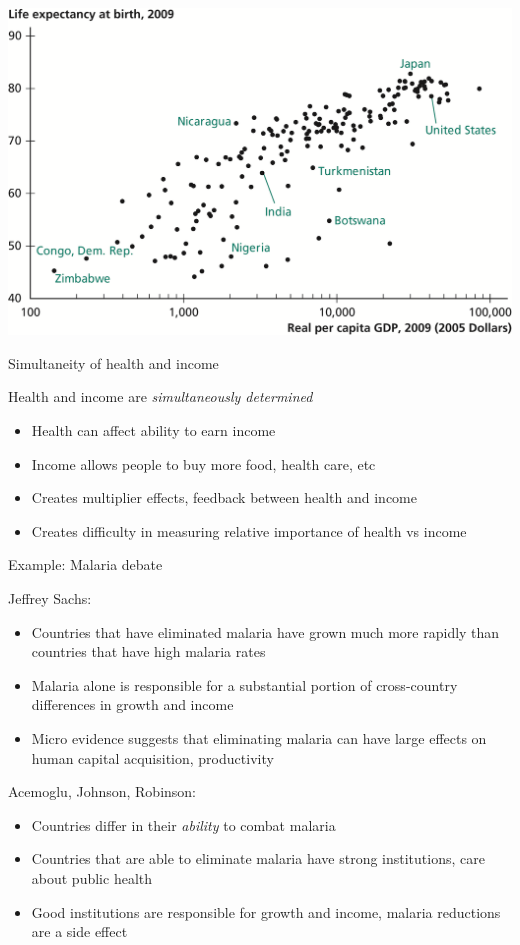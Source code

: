 \documentclass[10pt]{beamer}
\begin{document}
\begin{frame}[label={sec:org1004679}]{}
\begin{center}
\includegraphics[width=.75\textwidth]{./img/6.2.png}
\end{center}
\end{frame}

\begin{frame}[label={sec:org5c37440}]{}
\alert{Simultaneity of health and income}

Health and income are \emph{simultaneously determined}
\begin{itemize}
\item Health can affect ability to earn income
\item Income allows people to buy more food, health care, etc
\item Creates multiplier effects, feedback between health and income
\item Creates difficulty in measuring relative importance of health vs income
\end{itemize}
\end{frame}

\begin{frame}[label={sec:orgb455094}]{}
\alert{Example: Malaria debate}

Jeffrey Sachs:
\begin{itemize}
\item Countries that have eliminated malaria have grown much more rapidly than countries that have high malaria rates
\item Malaria alone is responsible for a substantial portion of cross-country differences in growth and income
\item Micro evidence suggests that eliminating malaria can have large effects on human capital acquisition, productivity
\end{itemize}

Acemoglu, Johnson, Robinson:
\begin{itemize}
\item Countries differ in their \emph{ability} to combat malaria
\item Countries that are able to eliminate malaria have strong institutions, care about public health
\item Good institutions are responsible for growth and income, malaria reductions are a side effect
\end{itemize}
\end{frame}
\end{document}
